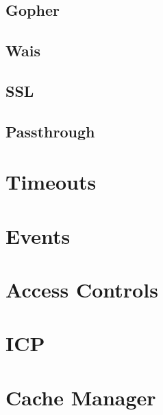 \section{Gopher}
\section{Wais}
\section{SSL}
\section{Passthrough}

\chapter{Timeouts}

\chapter{Events}

\chapter{Access Controls}

\chapter{ICP}

\chapter{Cache Manager}

\newpage 


\nocite{rfc850}
\nocite{rfc1123}


